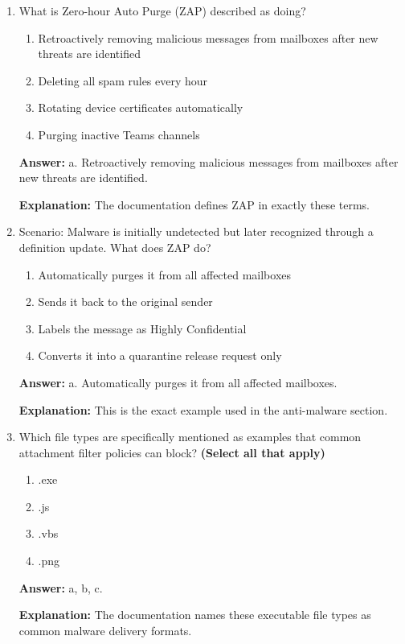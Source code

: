 \documentclass[10pt]{article}
\begin{document}
\begin{enumerate}[leftmargin=*]
\textbf{Explanation:} All four workloads are explicitly named in the anti-malware section.

\item What is Zero-hour Auto Purge (ZAP) described as doing?
\begin{enumerate}[label=\alph*., leftmargin=1.5em]
\item Retroactively removing malicious messages from mailboxes after new threats are identified
\item Deleting all spam rules every hour
\item Rotating device certificates automatically
\item Purging inactive Teams channels
\end{enumerate}
\textbf{Answer:} a. Retroactively removing malicious messages from mailboxes after new threats are identified.

\textbf{Explanation:} The documentation defines ZAP in exactly these terms.

\item Scenario: Malware is initially undetected but later recognized through a definition update. What does ZAP do?
\begin{enumerate}[label=\alph*., leftmargin=1.5em]
\item Automatically purges it from all affected mailboxes
\item Sends it back to the original sender
\item Labels the message as Highly Confidential
\item Converts it into a quarantine release request only
\end{enumerate}
\textbf{Answer:} a. Automatically purges it from all affected mailboxes.

\textbf{Explanation:} This is the exact example used in the anti-malware section.

\item Which file types are specifically mentioned as examples that common attachment filter policies can block? \textbf{(Select all that apply)}
\begin{enumerate}[label=\alph*., leftmargin=1.5em]
\item .exe
\item .js
\item .vbs
\item .png
\end{enumerate}
\textbf{Answer:} a, b, c.

\textbf{Explanation:} The documentation names these executable file types as common malware delivery formats.


\end{enumerate}
\end{document}

